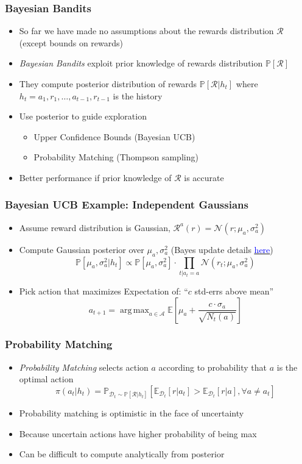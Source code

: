 \documentclass[handout]{beamer}
\DeclareMathOperator*{\argmax}{arg\,max}
\begin{document}
\begin{frame}
\frametitle{Bayesian Bandits}
\pause
\begin{itemize}
\item So far we have made no assumptions about the rewards distribution $\mathcal{R}$ (except bounds on rewards)
\item {\em Bayesian Bandits} exploit prior knowledge of rewards distribution $\mathbb{P}[\mathcal{R}]$
\item They compute posterior distribution of rewards $\mathbb{P}[\mathcal{R}|h_t]$ where $h_t = a_1,r_1, \ldots, a_{t-1}, r_{t-1}$ is the history
\item Use posterior to guide exploration
\begin{itemize}
\item Upper Confidence Bounds (Bayesian UCB)
\item Probability Matching (Thompson sampling)
\end{itemize}
\item Better performance if prior knowledge of $\mathcal{R}$ is accurate
\end{itemize}
\end{frame}

\begin{frame}
\frametitle{Bayesian UCB Example: Independent Gaussians}
\pause
\begin{itemize}[<+->]
\item Assume reward distribution is Gaussian, $\mathcal{R}^a(r) =\mathcal{N}(r;\mu_a, \sigma_a^2)$
\item Compute Gaussian posterior over $\mu_a,\sigma_a^2$  (Bayes update details \href{https://people.eecs.berkeley.edu/~jordan/courses/260-spring10/lectures/lecture5.pdf}{\underline{\textcolor{blue}{here}}})
$$\mathbb{P}[\mu_a, \sigma_a^2|h_t] \propto \mathbb{P}[\mu_a, \sigma_a^2] \cdot \prod_{t|a_t=a} \mathcal{N}(r_t;\mu_a, \sigma_a^2)$$
\item Pick action that maximizes Expectation of:  ``$c$ std-errs above mean''
$$a_{t+1} = \argmax_{a\in\mathcal{A}} \mathbb{E}[\mu_a + \frac {c \cdot \sigma_a} {\sqrt{N_t(a)}}]$$
\end{itemize}
\end{frame}


\begin{frame}
\frametitle{Probability Matching}
\pause
\begin{itemize}[<+->]
\item {\em Probability Matching} selects action $a$ according to probability that $a$ is the optimal action
$$\pi(a_t|h_t) = \mathbb{P}_{\mathcal{D}_t\sim \mathbb{P}[\mathcal{R}|h_t]}[\mathbb{E}_{\mathcal{D}_t}[r|a_t] > \mathbb{E}_{\mathcal{D}_t}[r|a], \forall a \neq a_t]$$
\item Probability matching is optimistic in the face of uncertainty
\item Because uncertain actions have higher probability of being max
\item Can be difficult to compute analytically from posterior
\end{itemize}
\end{frame}
\end{document}
